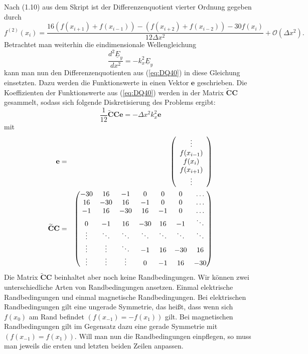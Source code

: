 \documentclass[Protokollheft.tex]{subfiles}
\begin{document}
Nach (1.10) aus dem Skript ist der Differenzenquotient vierter Ordnung gegeben durch
\begin{equation}
	\label{eq:DQ40}
	f^{(2)}(x_i)=\frac{16(f(x_{i+1})+f(x_{i-1}))-(f(x_{i+2})+f(x_{i-2}))-30f(x_i)}{12\Delta x^2}+\mathcal{O}(\Delta x^2).
\end{equation}
Betrachtet man weiterhin die eindimensionale Wellengleichung
\begin{equation*}
	\frac{d^2\underline{E}_y}{dx^2}=-k^2_x\underline{E}_y
\end{equation*}
kann man nun den Differenzenquotienten aus (\ref{eq:DQ40}) in diese Gleichung einsetzten. Dazu werden die Funktionswerte in einen Vektor $\mathbf{e}$ geschrieben. Die Koeffizienten der Funktionswerte aus (\ref{eq:DQ40}) werden in der Matrix $\mathbf{\widetilde{C}C}$ gesammelt, sodass sich folgende Diskretisierung des Problems ergibt:
\begin{equation}
	\label{eq:cc}
	\frac{1}{12}\mathbf{\widetilde{C}Ce}=-\Delta x^2k^2_x\mathbf{e}
\end{equation}
mit
\begin{eqnarray*}
\mathbf{e}&=&\left(\begin{array}{c} \vdots\\ f(x_{i-1})\\ f(x_i) \\ f(x_{i+1})\\
 \vdots\\\end{array}\right)\\
 \noindent
\mathbf{\widetilde{C}C}&=&\begin{pmatrix} -30 & 16 & -1 & 0 & 0 & 0 & \dots \\ 
16 & -30 & 16 & -1 & 0 & 0 & \dots\\ 
-1 & 16 & -30 & 16 & -1 & 0 & \dots\\ 
0 & -1 & 16 & -30 & 16 & -1 & \ddots\\ 
\vdots & \ddots & \ddots & \ddots & \ddots & \ddots & \ddots\\
\vdots & \vdots & \ddots & -1 & 16 & -30 & 16\\
\vdots & \vdots & \vdots & 0 & -1 & 16 & -30\\
\end{pmatrix}
\end{eqnarray*}
Die Matrix $\mathbf{\widetilde{C}C}$ beinhaltet aber noch keine Randbedingungen. Wir können zwei unterschiedliche Arten von Randbedingungen ansetzen. Einmal elektrische Randbedingungen und einmal magnetische Randbedingungen. Bei elektrischen Randbedingungen gilt eine ungerade Symmetrie, das heißt, dass wenn sich $f(x_0)$ am Rand befindet $(f(x_{-1})=-f(x_{1}))$ gilt. Bei magnetischen Randbedingungen gilt im Gegensatz dazu eine gerade Symmetrie mit $(f(x_{-1})=f(x_{1}))$. Will man nun die Randbedingungen einpflegen, so muss man jeweils die ersten und letzten beiden Zeilen anpassen.\\
\end{document}
